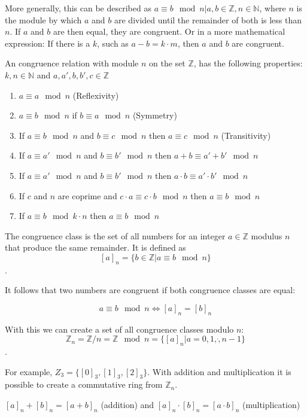 More generally, this can be described as $a \equiv b \mod n | a,b \in \mathbb{Z}, n \in \mathbb{N}$, where $n$ is the module by which $a$ and $b$ are divided until the remainder of both is less than $n$. If $a$ and $b$ are then equal, they are congruent. Or in a more mathematical expression: If there is a $k$, such as $a-b = k\cdot m$, then $a$ and $b$ are congruent.

An congruence relation with module $n$ on the set $\mathbb{Z}$, has the following properties:
$k,n \in \mathbb{N}$ and $a, a', b, b', c \in \mathbb{Z}$
\begin{enumerate}
  \item $a \equiv a \mod n$ (Reflexivity)
  \item $a \equiv b \mod n$ if $b \equiv a \mod n$ (Symmetry)
  \item If $a \equiv b \mod n$ and $b \equiv c \mod n$ then $a \equiv c \mod n$ (Transitivity)
  \item If $a \equiv a' \mod n$ and $b \equiv b' \mod n$ then $a+b \equiv a'+b' \mod n$
  \item If $a \equiv a' \mod n$ and $b \equiv b' \mod n$ then $a\cdot b \equiv a'\cdot b' \mod n$
  \item If $c$ and $n$ are coprime and $c \cdot a \equiv c \cdot b \mod n$ then $a \equiv b \mod n$
  \item If $a \equiv b \mod k\cdot n$ then $a \equiv b \mod n$
\end{enumerate}

The congruence class is the set of all numbers for an integer $a \in \mathbb{Z}$ modulus $n$ that produce the same remainder. It is defined as
$$[a]_n = \{b \in \mathbb{Z} | a \equiv b \mod n\}$$.

It follows that two numbers are congruent if both congruence classes are equal:

$$a \equiv b \mod n \Leftrightarrow [a]_n = [b]_n$$

With this we can create a set of all congruence classes modulo $n$:
$$\mathbb{Z}_n = \mathbb{Z}/n = \mathbb{Z} \mod n = \{[a]_n | a = 0, 1, \dot, n-1 \}$$.

For example, $Z_3 = \{[0]_3, [1]_3, [2]_3\}$. With addition and multiplication it is possible to create a commutative ring from $\mathbb{Z}_n$.
\begin{center}
    $[a]_n + [b]_n = [a+b]_n$ (addition) and $[a]_n \cdot [b]_n = [a\cdot b]_n$ (multiplication)
\end{center}

